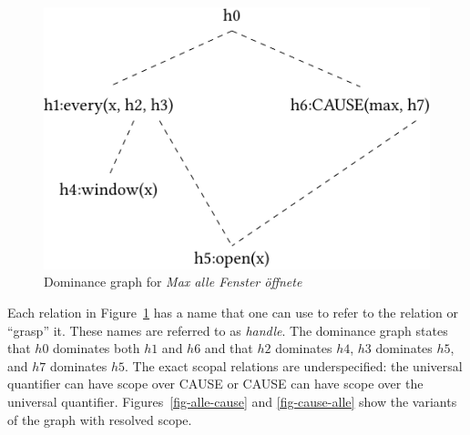 \begin{figure}
\centering
\includegraphics{Figures/max-alle-fenster-oeffnete-mrs-cropped.pdf}
\caption{Dominance graph for \emph{Max alle Fenster öffnete}\label{Abbildung-Max-alle-Fenster-oeffnete}}
\end{figure}%
Each relation in Figure~\ref{Abbildung-Max-alle-Fenster-oeffnete} has a name that one can use to refer to the relation or ``grasp'' it.
These names are referred to as \emph{handle}. The dominance graph states that $h0$ dominates both $h1$ and $h6$ and that
$h2$ dominates $h4$, $h3$ dominates $h5$, and $h7$ dominates $h5$. The exact scopal relations are underspecified: the universal quantifier can have scope over
CAUSE or CAUSE can have scope over the universal quantifier. Figures~\ref{fig-alle-cause} and
\ref{fig-cause-alle} show the variants of the graph with resolved scope.
